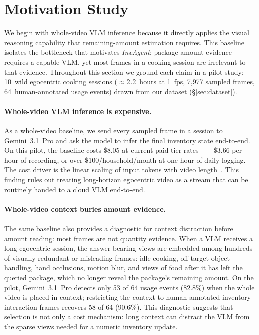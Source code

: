 \documentclass[sigconf,anonymous,nonacm]{acmart}
\newcommand{\sys}{\textit{InvAgent}\xspace}
\begin{document}
\section{Motivation Study}
\label{sec:bg-motivation}

We begin with whole-video VLM inference because it directly applies the visual reasoning
capability that remaining-amount estimation requires. This
baseline isolates the bottleneck that motivates \sys: package-amount
evidence requires a capable VLM, yet most frames in a cooking session
are irrelevant to that evidence.
Throughout this section we ground each claim in a pilot study: 10~wild
egocentric cooking sessions ($\approx$2.2~hours at 1~fps, 7{,}977
sampled frames, 64~human-annotated usage events) drawn from our dataset
(\S\ref{sec:dataset}).

\paragraph{Whole-video VLM inference is expensive.}
As a whole-video baseline, we send every sampled frame in a session to
Gemini~3.1~Pro and ask the model to infer the final inventory state
end-to-end. On this pilot, the baseline
costs \$8.05 at current paid-tier rates~\cite{googleGeminiAPIPricing2026}
--- \$3.66 per hour of recording, or over \$100/household/month at one
hour of daily logging. The cost driver is the linear scaling of input
tokens with video length~\cite{openaiAPIPricing2026,googleGeminiAPIPricing2026}.
This finding rules out treating long-horizon egocentric video as a
stream that can be routinely handed to a cloud VLM end-to-end.

\paragraph{Whole-video context buries amount evidence.}
The same baseline also provides a diagnostic for context distraction
before amount reading: most frames are not quantity evidence. When a VLM receives a
long egocentric session, the
answer-bearing views are embedded among hundreds of visually redundant
or misleading frames: idle cooking, off-target object handling, hand
occlusions, motion blur, and views of food after it has left the
queried package, which no longer reveal the package's remaining amount. On the
pilot, Gemini~3.1~Pro detects only 53 of 64 usage events (82.8\%)
when the whole video is placed in context; restricting the context to
human-annotated inventory-interaction frames recovers 58 of 64
(90.6\%). This diagnostic suggests that selection is not only a cost
mechanism: long context can distract the VLM from the sparse views
needed for a numeric inventory update.
\end{document}
